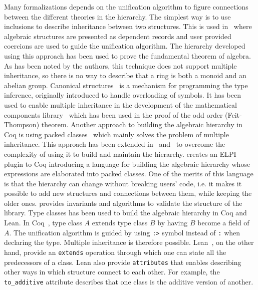 Many formalizations depends on the unification algorithm to figure connections between the different theories in the hierarchy. 
The simplest way is to use inclusions to describe inheritance between two structures. This is used in~\cite{Geuvers2002} where algebraic structures are presented as dependent records and user provided coercions are used to guide the unification algorithm. The hierarchy developed using this approach has been used to prove the fundamental theorem of algebra. As has been noted by the authors, this technique does not support multiple inheritance, so there is no way to describe that a ring is both a monoid and an abelian group. 
Canonical structures~\cite{canonical2013} is a mechanism for programming the type inference, originally introduced to handle overloading of symbols. It has been used to enable multiple inheritance in the development of the mathematical components library~\cite{mathCompBook2020} which has been used in the proof of the odd order (Feit-Thompson) theorem. 
Another approach to building the algebraic hierarchy in Coq is using packed classes~\cite{Gonthier2009} which mainly solves the problem of multiple inheritance. This approach has been extended in~\cite{cohen2020hierarchy} and~\cite{sakaguchi2020validating} to overcome the complexity of using it to build and maintain the hierarchy. \cite{cohen2020hierarchy} creates an ELPI~\cite{elpi,elpiForCoq} plugin to Coq introducing a language for building the algebraic hierarchy whose expressions are elaborated into packed classes. One of the merits of this language is that the hierarchy can change without breaking users' code, i.e. it makes it possible to add new structures and connections between them, while keeping the older ones. \cite{sakaguchi2020validating} provides invariants and algorithms to validate the structure of the library.  
Type classes has been used to build the algebraic hierarchy in Coq and Lean. In Coq~\cite{spitters2011type}, type class $A$ extends type class $B$ by having $B$ become a field of $A$. The unification algorithm is guided by using \verb|:>| symbol instead of \verb|:| when declaring the type. Multiple inheritance is therefore possible. Lean~\cite{lean2019}, on the other hand, provide an \verb|extends| operation through which one can state all the predecessors of a class. Lean also provide \verb|attributes| that enables describing other ways in which structure connect to each other. For example, the \verb|to_additive| attribute describes that one class is the additive version of another.

